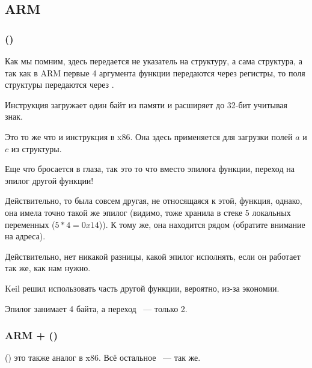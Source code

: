 \subsection{ARM}

\subsubsection{\OptimizingKeilVI (\ThumbMode)}



Как мы помним, здесь передается не указатель на структуру, а сама структура, а так как в ARM первые 4 аргумента
функции передаются через регистры, то поля структуры передаются через .

Инструкция  загружает один байт из памяти и расширяет до 32-бит учитывая знак.

Это то же что и инструкция \MOVSX в x86.
Она здесь применяется для загрузки полей $a$ и $c$ из структуры.

Еще что бросается в глаза, так это то что вместо эпилога функции, переход на эпилог другой функции!

Действительно, то была совсем другая, не относящаяся к этой, функция, однако, она имела точно такой же эпилог 
(видимо, тоже хранила в стеке 5 локальных переменных ($5*4=0x14$)).
К тому же, она находится рядом (обратите внимание на адреса).

Действительно, нет никакой разницы, какой эпилог исполнять, если он работает так же, как нам нужно.

Keil решил использовать часть другой функции, вероятно, из-за экономии.

Эпилог занимает 4 байта, а переход ~--- только 2.

\subsubsection{ARM + \OptimizingXcodeIV (\ThumbTwoMode)}



 () это также аналог \MOVSX в x86.
Всё остальное ~--- так же.

